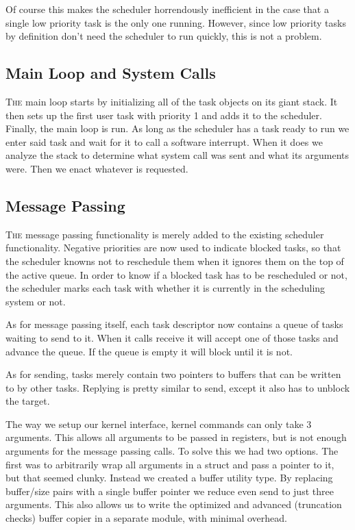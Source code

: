 \documentclass{article}
\begin{document}
Of course this makes the scheduler horrendously inefficient in the case that a
single low priority task is the only one running. However, since low priority
tasks by definition don't need the scheduler to run quickly, this is not a
problem.

\subsection*{Main Loop and System Calls}

\textsc{The} main loop starts by initializing all of the task objects on its giant stack.
It then sets up the first user task with priority 1 and adds it to the
scheduler. Finally, the main loop is run. As long as the scheduler has a task
ready to run we enter said task and wait for it to call a software interrupt.
When it does we analyze the stack to determine what system call was sent and
what its arguments were. Then we enact whatever is requested.


\subsection*{Message Passing}

\textsc{The} message passing functionality is merely added to the existing scheduler
functionality. Negative priorities are now used to indicate blocked tasks, so
that the scheduler knowns not to reschedule them when it ignores them on the top
of the active queue. In order to know if a blocked task has to be rescheduled or
not, the scheduler marks each task with whether it is currently in the
scheduling system or not.

As for message passing itself, each task descriptor now contains a queue of
tasks waiting to send to it. When it calls receive it will accept one of those
tasks and advance the queue. If the queue is empty it will block until it is
not.

As for sending, tasks merely contain two pointers to buffers that can be written
to by other tasks. Replying is pretty similar to send, except it also has to
unblock the target.

The way we setup our kernel interface, kernel commands can only take 3
arguments. This allows all arguments to be passed in registers, but is not
enough arguments for the message passing calls. To solve this we had two
options. The first was to arbitrarily wrap all arguments in a struct and pass a
pointer to it, but that seemed clunky. Instead we created a buffer utility type.
By replacing buffer/size pairs with a single buffer pointer we reduce even send
to just three arguments. This also allows us to write the optimized and advanced
(truncation checks) buffer copier in a separate module, with minimal overhead.
\end{document}
